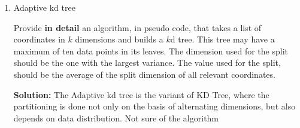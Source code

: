 \begin{enumerate}
\item
Adaptive kd tree

Provide \textbf{in detail} an algorithm, in pseudo code, that takes a list of coordinates in $k$ dimensions and builds a $k$d tree.
This tree may have a maximum of ten data points in its leaves.
The dimension used for the split should be the one with the largest variance.
The value used for the split, should be the average of the split dimension of all relevant coordinates.

{\bf Solution:}
The Adaptive kd tree is the variant of KD Tree, where the partitioning is done not only 		on the basis of alternating dimensions, but also depends on data distribution. 
Not sure of the algorithm 


\end{enumerate}


